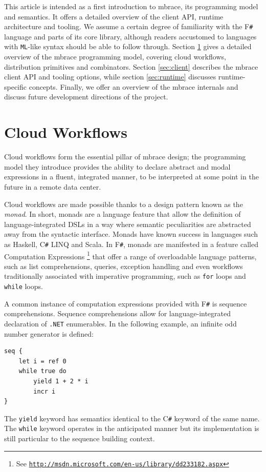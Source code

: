 \documentclass[9pt,a4paper]{article}
\newcommand{\mbrace}{mbrace}
\newcommand{\fsharp}{F\texttt \#}
\newcommand{\csharp}{C\texttt \#}
\newcommand{\dotnet}{\texttt{\hbox{.}NET}}
\newcommand{\samehref}[1]{\href{#1}{\texttt{#1}}}
\begin{document}
This article is intended as a first introduction to \mbrace{}, its programming model and semantics.
It offers a detailed overview of the client API, runtime architecture and tooling.
We assume a certain degree of familiarity with the \fsharp{} language and parts
of its core library, although readers accustomed to languages with \texttt{ML}-like syntax
should be able to follow through.
Section \ref{sec:workflows} gives a detailed overview of the \mbrace{} programming model,
covering cloud workflows, distribution primitives and combinators.
Section \ref{sec:client} describes the \mbrace{} client API and tooling options,
while section \ref{sec:runtime} discusses runtime-specific concepts.
Finally, we offer an overview of the \mbrace{} internals and discuss future
development directions of the project.
%


%
%

\section{Cloud Workflows}%
\label{sec:workflows}
%
Cloud workflows form the essential pillar of \mbrace{} design;
the programming model they introduce provides the ability to declare abstract
and modal expressions in a fluent, integrated manner, to be interpreted 
at some point in the future in a remote data center.

Cloud workflows are made possible thanks to a design pattern known as the \emph{monad}.
In short, monads are a language feature that allow the definition of language-integrated 
DSLs in a way where semantic peculiarities are abstracted away from the syntactic interface.
Monads have known success in languages such as Haskell, \csharp{} LINQ and Scala. 
In \fsharp, monads are manifested in a feature called 
Computation Expressions%
\footnote{See \samehref{http://msdn.microsoft.com/en-us/library/dd233182.aspx}}
that offer a range of overloadable language patterns, such as list comprehensions, 
queries, exception handling and even workflows traditionally associated with 
imperative programming, such as \texttt{for} loops and \texttt{while} loops.

A common instance of computation expressions provided with \fsharp{} is 
sequence comprehensions. Sequence comprehensions allow for language-integrated declaration 
of \dotnet{} enumerables. In the following example, an infinite odd number generator is 
defined:
\begin{lstlisting}
seq {
	let i = ref 0
	while true do
		yield 1 + 2 * i
		incr i
}
\end{lstlisting}
The \texttt{yield} keyword has semantics identical to the \csharp{} keyword of the same 
name. The \texttt{while} keyword operates in the anticipated manner but its implementation
is still particular to the sequence building context.
\end{document}
